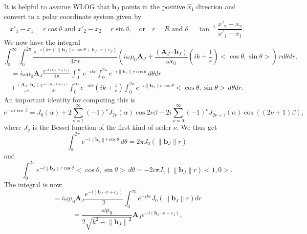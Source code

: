 \documentclass{article}
\newcommand{\norm}[1]{\left\lVert #1 \right\rVert}
\theoremstyle{plain}
\begin{document}
It is helpful to assume WLOG that $\mathbf{b}_J$ points in the positive $\hat{x}_1$ direction and convert to a polar coordinate system given by
\begin{equation}
	x'_1-x_1 = r\cos{\theta} \text{ and } x'_2-x_2 = r\sin{\theta}, \quad\text{or}\quad r = R \text{ and } \theta = \tan^{-1}{\frac{x'_2 - x_2}{x'_1 - x_1}}.
\end{equation}
We now have the integral
\begin{equation}
	\int_0^\infty \int_0^{2\pi} \frac{e^{-i(kr+\norm{\mathbf{b}_J}r\cos{\theta} + \mathbf{b}_J\cdot x + c_J)}}{4\pi r}
	\left( i\omega\mu_0 \mathbf{A}_J
	+ \frac{(\mathbf{A}_J\cdot\mathbf{b}_J)}{\omega\epsilon_0}\left( ik + \frac{1}{r} \right) <\cos{\theta},\sin{\theta}> \right) \,rd\theta dr,
\end{equation}
\begin{multline}
	=i\omega\mu_0 \mathbf{A}_J\frac{e^{-i(\mathbf{b}_J\cdot x + c_J)}}{4\pi}
	\int_0^\infty e^{-ikr} \int_0^{2\pi} e^{-i\norm{\mathbf{b}_J}r\cos{\theta}} \,d\theta dr \\
	+ \frac{(\mathbf{A}_J\cdot\mathbf{b}_J)}{\omega\epsilon_0}\frac{e^{-i(\mathbf{b}_J\cdot x + c_J)}}{4\pi}
	\int_0^\infty e^{-ikr}\left( ik + \frac{1}{r} \right) \int_0^{2\pi} e^{-i\norm{\mathbf{b}_J}r\cos{\theta}} <\cos{\theta},\sin{\theta}> \,d\theta dr.
\end{multline}
An important identity for computing this is
\begin{equation}
	e^{-i\alpha\cos{\beta}}
	= J_0(\alpha) + 2\sum_{\nu=1}^\infty (-1)^\nu J_{2\nu}(\alpha)\cos{2\nu\beta} 
	- 2i\sum_{\nu=0}^\infty (-1)^\nu J_{2\nu+1}(\alpha)\cos{\left((2\nu+1)\beta\right)},
\end{equation}
where $J_\nu$ is the Bessel function of the first kind of order $\nu$.
We thus get
\begin{equation}
	\int_0^{2\pi} e^{-i\norm{\mathbf{b}_J}r\cos{\theta}} \,d\theta = 2\pi J_0(\norm{\mathbf{b}_J}r)
\end{equation}
and
\begin{equation}
	\int_0^{2\pi} e^{-i\norm{\mathbf{b}_J}r\cos{\theta}} <\cos{\theta},\sin{\theta}> \,d\theta = -2i\pi J_1(\norm{\mathbf{b}_J}r)<1,0>.
\end{equation}
The integral is now
\begin{equation}
	=i\omega\mu_0 \mathbf{A}_J\frac{e^{-i(\mathbf{b}_J\cdot x + c_J)}}{2}
	\int_0^\infty e^{-ikr} J_0(\norm{\mathbf{b}_J}r) dr
\end{equation}
\begin{equation}
	= \frac{\omega\mu_0}{2\sqrt{k^2 - \norm{\mathbf{b}_J}^2}} \mathbf{A}_J e^{-i(\mathbf{b}_J\cdot x + c_J)}.
\end{equation}
\end{document}
